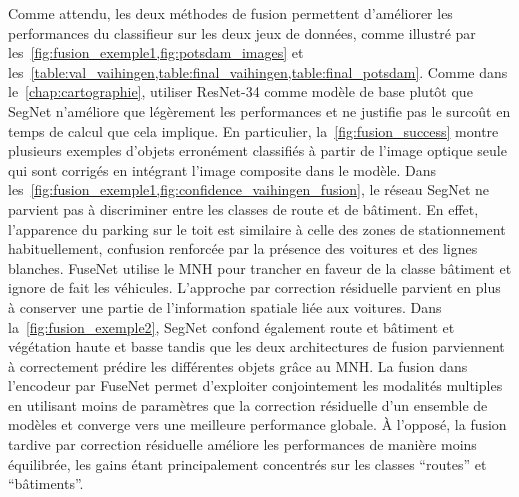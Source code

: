 Comme attendu, les deux méthodes de fusion permettent d'améliorer les performances du classifieur sur les deux jeux de données, comme illustré par les~\cref{fig:fusion_exemple1,fig:potsdam_images} et les~\cref{table:val_vaihingen,table:final_vaihingen,table:final_potsdam}. Comme dans le~\cref{chap:cartographie}, utiliser ResNet-34 comme modèle de base plutôt que SegNet n'améliore que légèrement les performances et ne justifie pas le surcoût en temps de calcul que cela implique. En particulier, la~\cref{fig:fusion_success} montre plusieurs exemples d'objets erronément classifiés à partir de l'image optique seule qui sont corrigés en intégrant l'image composite dans le modèle. Dans les~\cref{fig:fusion_exemple1,fig:confidence_vaihingen_fusion}, le réseau SegNet ne parvient pas à discriminer entre les classes de route et de bâtiment. En effet, l'apparence du parking sur le toit est similaire à celle des zones de stationnement habituellement, confusion renforcée par la présence des voitures et des lignes blanches. FuseNet utilise le \gls{MNH} pour trancher en faveur de la classe bâtiment et ignore de fait les véhicules. L'approche par correction résiduelle parvient en plus à conserver une partie de l'information spatiale liée aux voitures. Dans la~\cref{fig:fusion_exemple2}, SegNet confond également route et bâtiment et végétation haute et basse tandis que les deux architectures de fusion parviennent à correctement prédire les différentes objets grâce au \gls{MNH}.
La fusion dans l'encodeur par FuseNet permet d'exploiter conjointement les modalités multiples en utilisant moins de paramètres que la correction résiduelle d'un ensemble de modèles et converge vers une meilleure performance globale. À l'opposé, la fusion tardive par correction résiduelle améliore les performances de manière moins équilibrée, les gains étant principalement concentrés sur les classes ``routes'' et ``bâtiments''.

